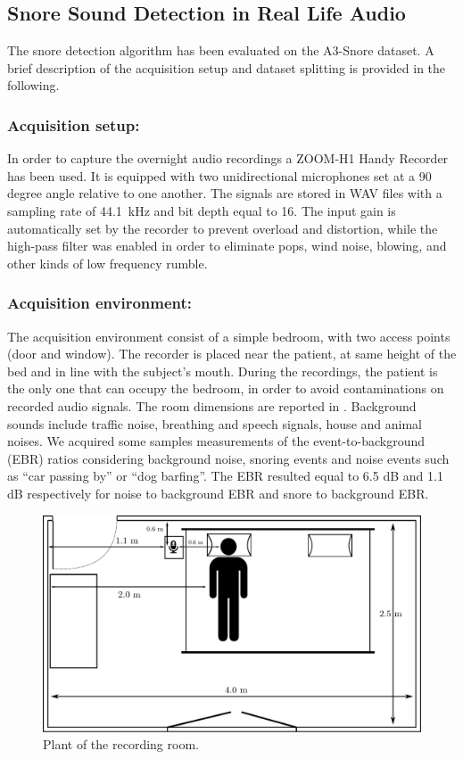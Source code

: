 \subsection{Snore Sound Detection in Real Life Audio}
\label{ssec:dataset}
The snore detection algorithm has been evaluated on the A3-Snore dataset. A brief description of the acquisition setup and dataset splitting is provided in the following.

\subsubsection{Acquisition setup:}
In order to capture the overnight audio recordings a ZOOM-H1 Handy Recorder has been used. It is equipped with two unidirectional microphones set at a 90 degree angle relative to one another. The signals are stored in WAV files with a sampling rate of 44.1\ kHz and bit depth equal to 16.
The input gain is automatically set by the recorder to prevent overload and distortion, while the high-pass filter was enabled in order to eliminate pops, wind noise, blowing, and other kinds of low frequency rumble.


\subsubsection{Acquisition environment:}
The acquisition environment consist of a simple bedroom, with two access points (door and window). The recorder is placed near the patient, at same height of the bed and in line with the subject's mouth. During the recordings, the patient is the only one that can occupy the bedroom, in order to avoid contaminations on recorded audio signals. The room dimensions are reported in .
Background sounds include traffic noise, breathing and speech signals, house and animal noises. We acquired some samples measurements of the event-to-background (EBR) ratios considering background noise, snoring events and noise events such as ``car passing by'' or ``dog barfing''. The EBR resulted equal to 6.5 dB and 1.1 dB respectively for noise to background EBR and snore to background EBR. 


\begin{figure}[t]
	\centering
	\includegraphics[width=0.8\columnwidth]{img/room.pdf}
	\caption{Plant of the recording room.} 
	\label{fig:room}
\end{figure}


